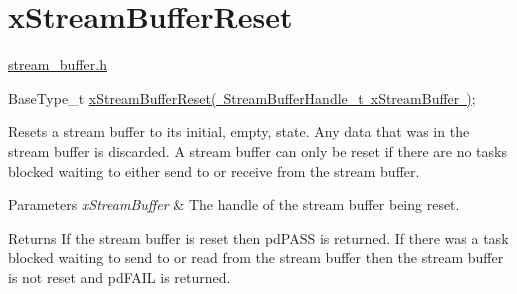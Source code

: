 \hypertarget{group__x_stream_buffer_reset}{}\section{x\+Stream\+Buffer\+Reset}
\label{group__x_stream_buffer_reset}
\mbox{\hyperlink{stream__buffer_8h}{stream\+\_\+buffer.\+h}}


\begin{DoxyPre}
BaseType\_t \mbox{\hyperlink{stream__buffer_8h_a5253429645c67902c2fc8682f8af0aac}{xStreamBufferReset( StreamBufferHandle\_t xStreamBuffer )}};
\end{DoxyPre}


Resets a stream buffer to its initial, empty, state. Any data that was in the stream buffer is discarded. A stream buffer can only be reset if there are no tasks blocked waiting to either send to or receive from the stream buffer.


\begin{DoxyParams}{Parameters}
{\em x\+Stream\+Buffer} & The handle of the stream buffer being reset.\\
\hline
\end{DoxyParams}
\begin{DoxyReturn}{Returns}
If the stream buffer is reset then pd\+P\+A\+SS is returned. If there was a task blocked waiting to send to or read from the stream buffer then the stream buffer is not reset and pd\+F\+A\+IL is returned. 
\end{DoxyReturn}
